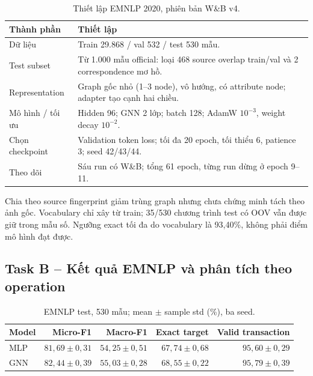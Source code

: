 \begin{table}[H]\centering\small
\caption{Thiết lập EMNLP 2020, phiên bản W\&B v4.}
\begin{tabularx}{\linewidth}{@{}p{38mm}X@{}}\toprule
Thành phần & Thiết lập\\\midrule
Dữ liệu & Train 29.868 / val 532 / test 530 mẫu.\\
Test subset & Từ 1.000 mẫu official: loại 468 source overlap train/val và 2 correspondence mơ hồ.\\
Representation & Graph gốc nhỏ (1--3 node), vô hướng, có attribute node; adapter tạo cạnh hai chiều.\\
Mô hình / tối ưu & Hidden 96; GNN 2 lớp; batch 128; AdamW $10^{-3}$, weight decay $10^{-2}$.\\
Chọn checkpoint & Validation token loss; tối đa 20 epoch, tối thiểu 6, patience 3; seed 42/43/44.\\
Theo dõi & Sáu run có W\&B; tổng 61 epoch, từng run dừng ở epoch 9--11.\\
\bottomrule\end{tabularx}\end{table}

Chia theo source fingerprint giảm trùng graph nhưng chưa chứng minh tách theo
ảnh gốc. Vocabulary chỉ xây từ train; 35/530 chương trình test có OOV vẫn được
giữ trong mẫu số. Ngưỡng exact tối đa do vocabulary là 93,40\%, không phải điểm
mô hình đạt được.


\clearpage
\subsection{Task B -- Kết quả EMNLP và phân tích theo operation}
\begin{table}[H]\centering\small
\caption{EMNLP test, 530 mẫu; mean $\pm$ sample std (\%), ba seed.}\label{tab:emnlp}
\begin{tabular}{@{}lrrrr@{}}\toprule
Model & Micro-F1 & Macro-F1 & Exact target & Valid transaction\\\midrule
MLP & $81,69\pm0,31$ & $54,25\pm0,51$ & $67,74\pm0,68$ & $95,60\pm0,29$\\
GNN & $82,44\pm0,39$ & $55,03\pm0,28$ & $68,55\pm0,22$ & $95,79\pm0,39$\\
\bottomrule\end{tabular}\end{table}

